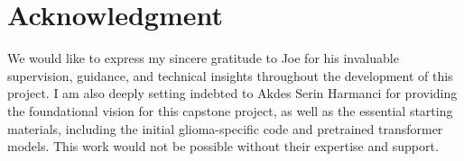 \documentclass[conference]{IEEEtran}
\begin{document}
\section{Acknowledgment}
We would like to express my sincere gratitude to Joe for his invaluable supervision, guidance, and technical insights throughout the development of this project. I am also deeply setting indebted to Akdes Serin Harmanci for providing the foundational vision for this capstone project, as well as the essential starting materials, including the initial glioma-specific code and pretrained transformer models. This work would not be possible without their expertise and support.



\vspace{12pt}
\end{document}
